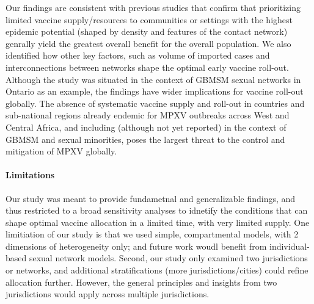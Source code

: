 Our findings are consistent with previous studies that confirm that prioritizing limited vaccine 
supply/resources to communities or settings with the highest epidemic potential (shaped by 
density and features of the contact network) genrally yield the greatest overall benefit for the 
overall population. We also identified how other key factors, such as volume of imported cases and 
interconnections between networks shape the optimal early vaccine roll-out. Although the study was situated
in the context of GBMSM sexual networks in Ontario as an example, the findings have wider implications for vaccine roll-out globally. The absence of systematic vaccine supply and roll-out in countries and sub-national regions already endemic for MPXV outbreaks across West and Central Africa, and including (although not yet reported) in the context of GBMSM and sexual minorities, poses the largest threat to the control and mitigation of MPXV globally. %
\par
\paragraph{Limitations}
Our study was meant to provide fundametnal and generalizable findings, and thus
restricted to a broad sensitivity analyses to idnetify the conditions that can shape 
optimal vaccine allocation in a limited time, with very limited supply. One limitiation 
of our study is that we used simple, compartmental models, with 2 dimensions of heterogeneity only; and 
future work woudl benefit from individual-based sexual network models. Second, our study only examined
two jurisdictions or networks, and additional stratifications (more jurisdictions/cities) could refine allocation further. 
However, the general principles and insights from two jurisdictions would apply across multiple jurisdictions. 
\par
